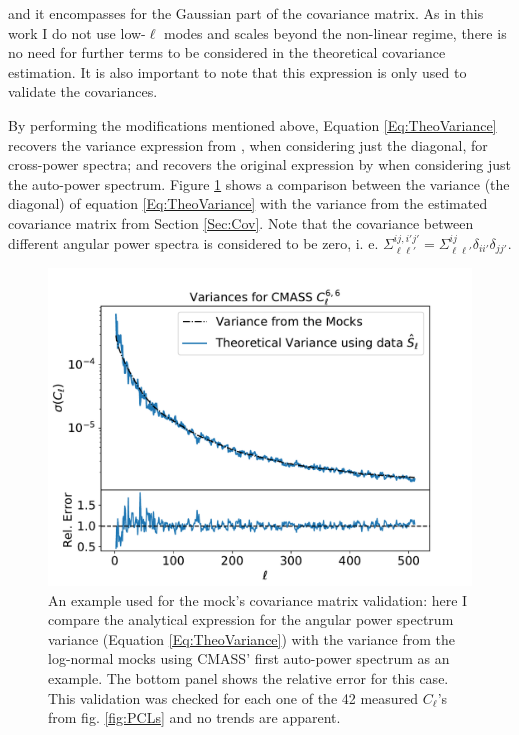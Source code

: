 and it encompasses for the Gaussian part of the covariance matrix. As in this work I do not use low-$\ell$ modes and scales beyond the non-linear regime, there is no need for further terms to be considered in the theoretical covariance estimation. It is also important to note that this expression is only used to validate the \flask covariances.

\qquad By performing the modifications mentioned above, Equation \eqref{Eq:TheoVariance} recovers the variance expression from \cite{Rassat2007}, when considering just the diagonal, for cross-power spectra; and recovers the original expression by \cite{2008DahlenSimons} when considering just the auto-power spectrum. Figure \ref{fig:Mocks_Variance} shows a comparison between the variance (the diagonal) of equation \eqref{Eq:TheoVariance} with the variance from the estimated covariance matrix from Section \ref{Sec:Cov}. Note that the covariance between different angular power spectra is considered to be zero, i. e. $\Sigma^{ij,i'j'}_{\ell\ell'} = \Sigma^{ij}_{\ell\ell'} \delta_{ii'}\delta_{jj'}$.

\begin{figure}
\begin{center}
\includegraphics[scale=0.65]{BOSS-FIGS/MocksValidation.pdf}
\caption[Mock's covariance matrix validation.]{An example used for the mock's covariance matrix validation: here I compare the analytical expression for the angular power spectrum variance (Equation \eqref{Eq:TheoVariance}) with the variance from the log-normal mocks using CMASS' first auto-power spectrum as an example. The bottom panel shows the relative error for this case. This validation was checked for each one of the 42 measured $C_{\ell}$'s from fig. \ref{fig:PCLs} and no trends are apparent.}
\label{fig:Mocks_Variance}
\end{center}
\end{figure}


